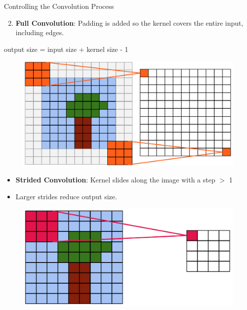 \documentclass[10pt]{beamer}
\theoremstyle{remark}
\theoremstyle{definition}
\begin{document}
\begin{frame}[allowframebreaks]{Controlling the Convolution Process}
\framebreak

\begin{itemize}
    \begin{enumerate}
    \setcounter{enumi}{1}
    \item \textbf{Full Convolution}:  Padding is added so the kernel covers the entire input, including edges. 
    \end{enumerate}
    \begin{itemize}
    output size = input size + kernel size - 1
    \end{itemize}
\end{itemize}


\begin{figure}
\centering
\includegraphics[width=1.0\textwidth,height=0.8\textheight,keepaspectratio]{./images/pad_2.png}
\end{figure}
    
\framebreak

\begin{itemize}
    \item \textbf{Strided Convolution}: Kernel slides along the image with a step $>$ 1
    \item Larger strides reduce output size.
\end{itemize}


\begin{figure}
\centering
\includegraphics[width=1.0\textwidth,height=0.8\textheight,keepaspectratio]{./images/stride_1.png}
\end{figure}



\end{frame}
\end{document}
